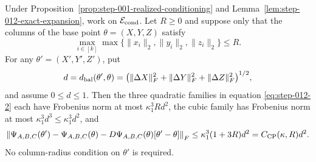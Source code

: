 \begin{proposition}
\label{prop:step-012-raw-remainder}
Under Proposition~\ref{prop:step-001-realized-conditioning} and
Lemma~\ref{lem:step-012-exact-expansion}, work on
\(\mathcal E_{\rm cond}\). Let \(R\ge0\) and suppose only that the columns
of the base point \(\theta=(X,Y,Z)\) satisfy
\begin{equation}
  \max_{i\in[k]}
  \max\{\|x_i\|_2,\|y_i\|_2,\|z_i\|_2\}\le R.             \label{eq:step-012-3}
\end{equation}
For any \(\theta'=(X',Y',Z')\), put
\[
  d=d_{\rm bal}(\theta',\theta)
   =\bigl(\|\Delta X\|_F^2+\|\Delta Y\|_F^2
           +\|\Delta Z\|_F^2\bigr)^{1/2},
\]
and assume \(0\le d\le1\). Then the three quadratic families in equation
\eqref{eq:step-012-2} each have Frobenius norm at most \(\kappa_1^3Rd^2\), the cubic family
has Frobenius norm at most \(\kappa_1^3d^3\le\kappa_1^3d^2\), and
\begin{equation}
  \left\|\Psi_{A,B,C}(\theta')-\Psi_{A,B,C}(\theta)
  -D\Psi_{A,B,C}(\theta)[\theta'-\theta]\right\|_F
  \le \kappa_1^3(1+3R)d^2
  =C_{\rm CP}(\kappa,R)d^2.                               \label{eq:step-012-4}
\end{equation}
No column-radius condition on \(\theta'\) is required.

\end{proposition}

